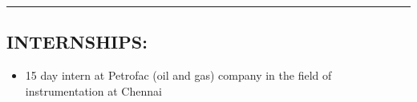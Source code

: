 \documentclass[10pts]{report}
\begin{document}
\par\noindent\rule{\textwidth}{0.1pt}
\begin{flushleft}
         \section*{INTERNSHIPS:}
              \begin{itemize}
                 \item 15 day intern at Petrofac (oil and gas) company in the field of instrumentation at Chennai
               \end{itemize}     
\end{flushleft}
\end{document}
